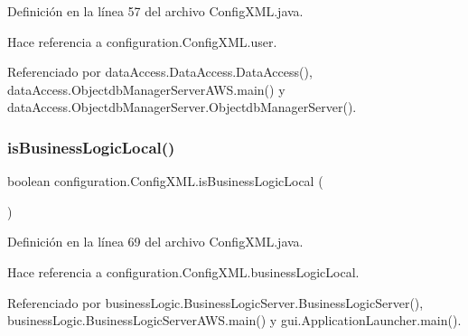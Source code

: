 Definición en la línea 57 del archivo Config\+X\+M\+L.\+java.


\begin{DoxyCode}{0}

\end{DoxyCode}


Hace referencia a configuration.\+Config\+X\+M\+L.\+user.



Referenciado por data\+Access.\+Data\+Access.\+Data\+Access(), data\+Access.\+Objectdb\+Manager\+Server\+A\+W\+S.\+main() y data\+Access.\+Objectdb\+Manager\+Server.\+Objectdb\+Manager\+Server().

\mbox{\label{classconfiguration_1_1ConfigXML_a3055cd4f61151ef6d1c48a5ebf86b33f}} 
\subsubsection{\texorpdfstring{isBusinessLogicLocal()}{isBusinessLogicLocal()}}
{\footnotesize\ttfamily boolean configuration.\+Config\+X\+M\+L.\+is\+Business\+Logic\+Local (\begin{DoxyParamCaption}{ }\end{DoxyParamCaption})}



Definición en la línea 69 del archivo Config\+X\+M\+L.\+java.


\begin{DoxyCode}{0}

\end{DoxyCode}


Hace referencia a configuration.\+Config\+X\+M\+L.\+business\+Logic\+Local.



Referenciado por business\+Logic.\+Business\+Logic\+Server.\+Business\+Logic\+Server(), business\+Logic.\+Business\+Logic\+Server\+A\+W\+S.\+main() y gui.\+Application\+Launcher.\+main().

